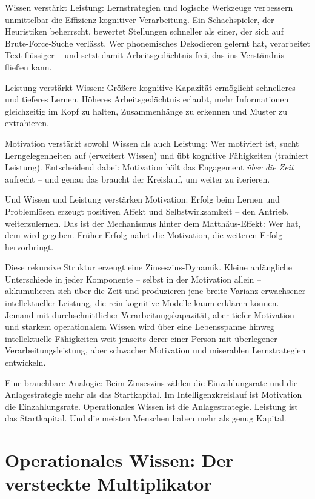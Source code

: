 \documentclass[11pt, twoside, openright]{book}
\begin{document}
Wissen verstärkt Leistung: Lernstrategien und logische Werkzeuge verbessern unmittelbar die Effizienz kognitiver Verarbeitung. Ein Schachspieler, der Heuristiken beherrscht, bewertet Stellungen schneller als einer, der sich auf Brute-Force-Suche verlässt. Wer phonemisches Dekodieren gelernt hat, verarbeitet Text flüssiger -- und setzt damit Arbeitsgedächtnis frei, das ins Verständnis fließen kann.

Leistung verstärkt Wissen: Größere kognitive Kapazität ermöglicht schnelleres und tieferes Lernen. Höheres Arbeitsgedächtnis erlaubt, mehr Informationen gleichzeitig im Kopf zu halten, Zusammenhänge zu erkennen und Muster zu extrahieren.

Motivation verstärkt sowohl Wissen als auch Leistung: Wer motiviert ist, sucht Lerngelegenheiten auf (erweitert Wissen) und übt kognitive Fähigkeiten (trainiert Leistung). Entscheidend dabei: Motivation hält das Engagement \textit{über die Zeit} aufrecht -- und genau das braucht der Kreislauf, um weiter zu iterieren.

Und Wissen und Leistung verstärken Motivation: Erfolg beim Lernen und Problemlösen erzeugt positiven Affekt und Selbstwirksamkeit -- den Antrieb, weiterzulernen. Das ist der Mechanismus hinter dem Matthäus-Effekt: Wer hat, dem wird gegeben. Früher Erfolg nährt die Motivation, die weiteren Erfolg hervorbringt.

Diese rekursive Struktur erzeugt eine Zinseszins-Dynamik. Kleine anfängliche Unterschiede in jeder Komponente -- selbst in der Motivation allein -- akkumulieren sich über die Zeit und produzieren jene breite Varianz erwachsener intellektueller Leistung, die rein kognitive Modelle kaum erklären können. Jemand mit durchschnittlicher Verarbeitungskapazität, aber tiefer Motivation und starkem operationalem Wissen wird über eine Lebensspanne hinweg intellektuelle Fähigkeiten weit jenseits derer einer Person mit überlegener Verarbeitungsleistung, aber schwacher Motivation und miserablen Lernstrategien entwickeln.

Eine brauchbare Analogie: Beim Zinseszins zählen die Einzahlungsrate und die Anlagestrategie mehr als das Startkapital. Im Intelligenzkreislauf ist Motivation die Einzahlungsrate. Operationales Wissen ist die Anlagestrategie. Leistung ist das Startkapital. Und die meisten Menschen haben mehr als genug Kapital.

\section*{Operationales Wissen: Der versteckte Multiplikator}
\end{document}
